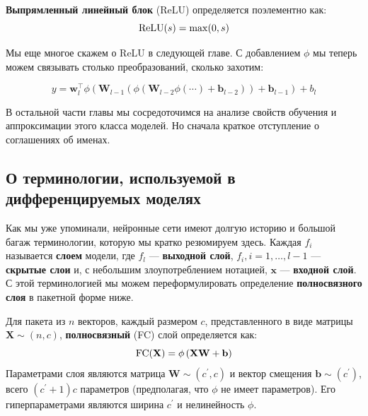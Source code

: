 \begin{definition} \addbottle
\textbf{Выпрямленный линейный блок} (ReLU) определяется поэлементно как:
%
\begin{equation}
\textnormal{ReLU}(s)=\max(0,s)
\label{eq:relu}
\end{equation}
\end{definition}

Мы еще многое скажем о ReLU в следующей главе. С добавлением $\phi$ мы теперь можем связывать столько преобразований, сколько захотим:

\begin{equation}
y = \mathbf{w}_l^\top\phi\left( \mathbf{W}_{l-1}\left(\phi\left( \mathbf{W}_{l-2}\phi\left(\cdots\right)+\mathbf{b}_{l-2} \right)\right)+\mathbf{b}_{l-1} \right) + b_l
\label{eq:mlps_multiple_hidden_layer}
\end{equation}

В остальной части главы мы сосредоточимся на анализе свойств обучения и аппроксимации этого класса моделей. Но сначала краткое отступление о соглашениях об именах.

\subsection*{О терминологии, используемой в дифференцируемых моделях}

Как мы уже упоминали, нейронные сети имеют долгую историю и большой багаж терминологии, которую мы кратко резюмируем здесь. Каждая $f_i$ называется \textbf{слоем} модели, где $f_l$ — \textbf{выходной слой}, $f_{i}, i=1,\ldots,l-1$ — \textbf{скрытые слои} и, с небольшим злоупотреблением нотацией, $\mathbf{x}$ — \textbf{входной слой}. С этой терминологией мы можем переформулировать определение \textbf{полносвязного слоя} в пакетной форме ниже.

\begin{definition} \addbottle
Для пакета из $n$ векторов, каждый размером $c$, представленного в виде матрицы $\mathbf{X} \sim (n,c)$, \textbf{полносвязный} (FC) слой определяется как:
%
\begin{equation}
\textnormal{FC}(\mathbf{X}) = \phi\left(\mathbf{X}\mathbf{W} + \mathbf{b}\right)
\label{eq:fully_connected_layer}
\end{equation}
%
Параметрами слоя являются матрица $\mathbf{W} \sim (c^\prime,c)$ и вектор смещения $\mathbf{b} \sim (c^\prime)$, всего $(c^\prime+1)c$ параметров (предполагая, что $\phi$ не имеет параметров). Его гиперпараметрами являются ширина $c^\prime$ и нелинейность $\phi$.
\end{definition}

